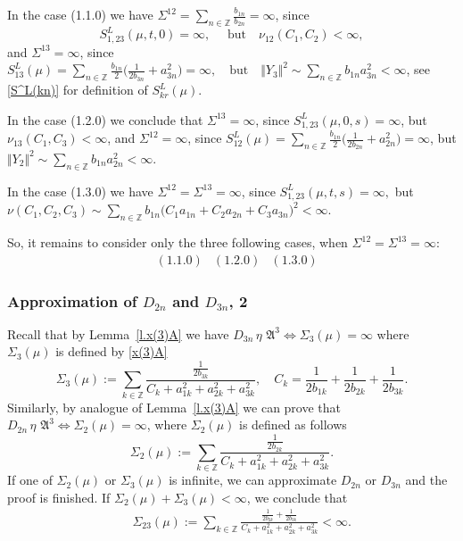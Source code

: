\documentclass[preprint,12pt]{elsarticle}
\numberwithin{equation}{section}
\begin{document}
\begin{rem}
\label{r.(11)-(13).(0)}
In the case (1.1.0) we have $
\Sigma^{12}=\sum_{n\in \mathbb Z}\frac{b_{1n}}{b_{2n}}=
\infty$, since 
$$S^{L}_{1,23}(\mu,t,0)=\infty,\quad\text{ but} 
\quad\nu_{12}( C_1, C_2)<\infty,$$
and $\Sigma^{13}=\infty$, since 
$
S^L_{13}(\mu)=\sum_{n\in{\mathbb
Z}}\frac{b_{1n}}{2}\Big(\frac{1}{2b_{3n}}+a_{3n}^2\Big)=\infty,\quad\text{but}  \quad\Vert Y_3\Vert^2\sim \sum_{n\in \mathbb Z}b_{1n}a_{3n}^2<\infty$, see \eqref{S^L(kn)} for definition of $S^L_{kr}(\mu)$.
%

In the case (1.2.0) we conclude that $\Sigma^{13}
=\infty$, since $S^{L}_{1,23}(\mu,0,s)=\infty$, but $\nu_{13}( C_1, C_3)<\infty$, and $\Sigma^{12}=\infty$, since  $S^L_{12}(\mu)=\sum_{n\in{\mathbb
Z}}\frac{b_{1n}}{2}\Big(\frac{1}{2b_{2n}}+a_{2n}^2\Big)=\infty$, but $\Vert Y_2\Vert^2\sim\sum_{n\in \mathbb Z}b_{1n}a_{2n}^2<\infty$.
%


In the case (1.3.0) we have $\Sigma^{12}=\Sigma^{13}=\infty$, since $S_{1,23}^{L}(\mu,t,s)=\infty,$ but $\nu(C_1,C_2,C_3)\sim\! \sum_{n\in \mathbb Z}b_{1n}\Big( C_1a_{1n}\!+\!C_2a_{2n}
\!+\!C_3a_{3n}\Big)^2<\infty$. 
\end{rem}
%
So, it remains to consider only the three following cases, when $\Sigma^{12}\!=\!\Sigma^{13}\!=\!\infty$:
$$
\begin{array}{cccc}
   &(1.1.0)&(1.2.0)&(1.3.0)
\end{array}
$$
%
\subsubsection{Approximation of $D_{2n}$ and $D_{3n}$, 2}
\label{s.445}
%
 Recall that by Lemma~\ref{l.x(3)A} we have $D_{3n}\,\eta\,\, {\mathfrak A}^3\Leftrightarrow \Sigma_3(\mu)=\infty$ where $\Sigma_3(\mu)$ is defined by  \eqref{x(3)A}
$$
\Sigma_3(\mu):=
\sum_{k\in \mathbb Z}\frac{\frac{1}{2b_{3k}}}{C_k+a_{1k}^2+a_{2k}^2+a_{3k}^2},\quad
C_k=\frac{1}{2b_{1k}}+\frac{1}{2b_{2k}}+\frac{1}{2b_{3k}}.
$$
Similarly, by analogue of Lemma~\ref{l.x(3)A} we can prove that 
$D_{2n}\,\eta\,\, {\mathfrak A}^3\Leftrightarrow \Sigma_2(\mu)=\infty$, where $\Sigma_2(\mu)$ is defined as follows
$$
\Sigma_2(\mu):=\sum_{k\in \mathbb Z}\frac{\frac{1}{2b_{2k}}}{C_k
+a_{1k}^2+a_{2k}^2+a_{3k}^2}.
$$
If one of $\Sigma_2(\mu)$ or $\Sigma_3(\mu)$ is infinite, we can approximate $D_{2n}$ or $D_{3n}$ and the proof is finished. 
If  $\Sigma_2(\mu)+\Sigma_3(\mu)<\infty$, we conclude that
%
\begin{eqnarray}
\label{sigma(23)(mu)}
&& 
\Sigma_{23}(\mu):=\sum_{k\in \mathbb Z}\frac{\frac{1}{2b_{2k}}
+\frac{1}{2b_{3k}}
}{C_k
+a_{1k}^2+a_{2k}^2+a_{3k}^2}<\infty.
\end{eqnarray}
%
\end{document}
